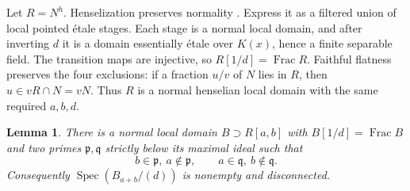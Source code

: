 \documentclass[11pt,a4paper]{article}
\newtheorem{lemma}[theorem]{Lemma}
\theoremstyle{definition}
\newcommand{\Spec}{\operatorname{Spec}}
\begin{document}
Let $R=N^h$. Henselization preserves normality \cite[tag 06DI]{Stacks}. Express it as a filtered union of local pointed étale stages. Each stage is a normal local domain, and after inverting $d$ it is a domain essentially étale over $K(x)$, hence a finite separable field. The transition maps are injective, so $R[1/d]=\operatorname{Frac}R$. Faithful flatness preserves the four exclusions: if a fraction $u/v$ of $N$ lies in $R$, then $u\in vR\cap N=vN$. Thus $R$ is a normal henselian local domain with the same required $a,b,d$.

\begin{lemma}\label{lem:two-branches}
There is a normal local domain $B\supset R[a,b]$ with $B[1/d]=\operatorname{Frac}B$ and two primes $\mathfrak p,\mathfrak q$ strictly below its maximal ideal such that
\[
 b\in\mathfrak p,\ a\notin\mathfrak p,
 \qquad a\in\mathfrak q,\ b\notin\mathfrak q.
\]
Consequently $\Spec(B_{a+b}/(d))$ is nonempty and disconnected.
\end{lemma}
\end{document}
